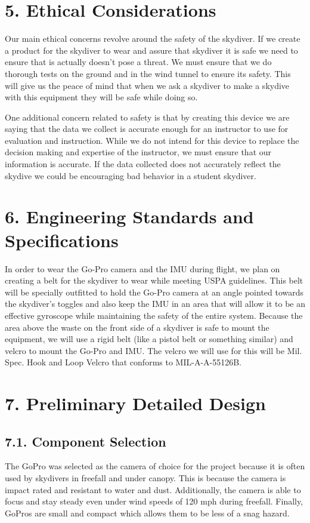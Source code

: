 \documentclass[10pt]{article}
\begin{document}
\section{5. Ethical Considerations}
Our main ethical concerns revolve around the safety of the skydiver. If we create a product for the skydiver to wear and assure that skydiver it is safe we need to ensure that is actually doesn’t pose a threat. We must ensure that we do thorough tests on the ground and in the wind tunnel to ensure its safety. This will give us the peace of mind that when we ask a skydiver to make a skydive with this equipment they will be safe while doing so.

One additional concern related to safety is that by creating this device we are saying that the data we collect is accurate enough for an instructor to use for evaluation and instruction. While we do not intend for this device to replace the decision making and expertise of the instructor, we must ensure that our information is accurate. If the data collected does not accurately reflect the skydive we could be encouraging bad behavior in a student skydiver.



\section{6. Engineering Standards and Specifications}
In order to wear the Go-Pro camera and the IMU during flight, we plan on creating a belt for the skydiver to wear while meeting USPA guidelines. This belt will be specially outfitted to hold the Go-Pro camera at an angle pointed towards the skydiver’s toggles and also keep the IMU in an area that will allow it to be an effective gyroscope while maintaining the safety of the entire system. Because the area above the waste on the front side of a skydiver is safe to mount the equipment, we will use a rigid belt (like a pistol belt or something similar) and velcro to mount the Go-Pro and IMU. The velcro we will use for this will be Mil. Spec. Hook and Loop Velcro that conforms to MIL-A-A-55126B.



\section{7. Preliminary Detailed Design}
\subsection{7.1. Component Selection}
The GoPro was selected as the camera of choice for the project because it is often used by skydivers in freefall and under canopy. This is because the camera is impact rated and resistant to water and dust. Additionally, the camera is able to focus and stay steady even under wind speeds of 120 mph during freefall. Finally, GoPros are small and compact which allows them to be less of a snag hazard.
\end{document}
